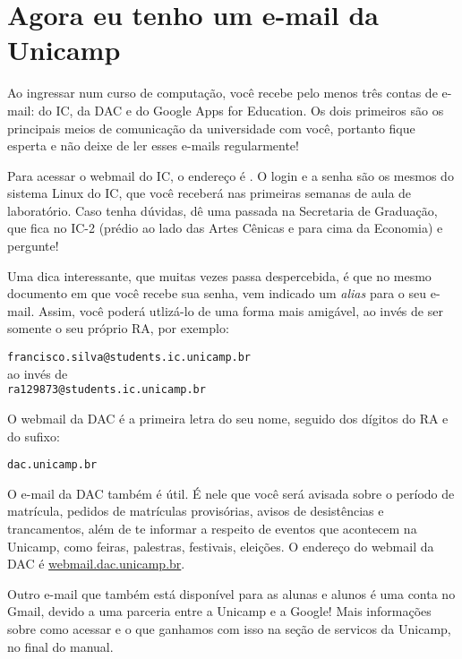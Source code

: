 
\section{Agora eu tenho um e-mail da Unicamp}

Ao ingressar num curso de computação, você recebe pelo menos três contas de
e-mail: do IC, da DAC e do Google Apps for Education. Os dois primeiros são os
principais meios de comunicação da universidade com você, portanto fique
esperta e não deixe de ler esses e-mails regularmente!

Para acessar o webmail do IC, o endereço é
. O login e a senha são os
mesmos do sistema Linux do IC, que você receberá nas primeiras semanas de
aula de laboratório. Caso tenha dúvidas, dê uma passada na Secretaria de
Graduação, que fica no IC-2 (prédio ao lado das Artes Cênicas e para cima da
Economia) e pergunte!

Uma dica interessante, que muitas vezes passa despercebida, é que no mesmo
documento em que você recebe sua senha, vem indicado um {\it alias} para o seu
e-mail. Assim, você poderá utlizá-lo de uma forma mais amigável, ao invés de
ser somente o seu próprio RA, por exemplo:

\begin{center}
\texttt{francisco.silva@students.ic.unicamp.br}\\
ao invés de\\
\texttt{ra129873@students.ic.unicamp.br}
\end{center}

O webmail da DAC é a primeira letra do seu nome, seguido dos dígitos do RA e do
sufixo:
\begin{center}
\texttt{dac.unicamp.br}
\end{center}
O e-mail da DAC também é útil. É nele que você será avisada sobre o período
de matrícula, pedidos de matrículas provisórias, avisos de desistências e
trancamentos, além de te informar a respeito de eventos que acontecem na
Unicamp, como feiras, palestras, festivais, eleições. O endereço do webmail da
DAC é \url{webmail.dac.unicamp.br}.

Outro e-mail que também está disponível para as alunas e alunos é uma conta no
Gmail, devido a uma parceria entre a Unicamp e a Google! Mais informações sobre
como acessar e o que ganhamos com isso na seção de servicos da Unicamp, no
final do manual.

